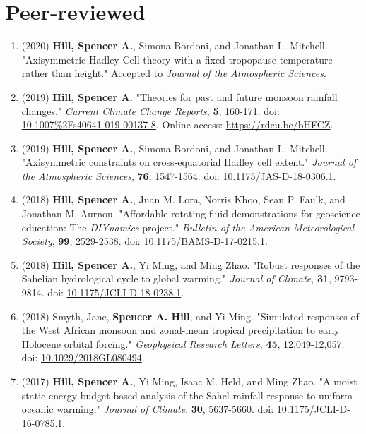 \documentclass[12pt,letterpaper]{shillcv}
\begin{document}
\section*{Peer-reviewed}
\label{sec:org142e150}
\begin{enumerate}
\item (2020) \textbf{Hill, Spencer A.}, Simona Bordoni, and Jonathan L. Mitchell.
"Axisymmetric Hadley Cell theory with a fixed tropopause temperature rather
than height."  Accepted to \emph{Journal of the Atmospheric Sciences}.
\item (2019) \textbf{Hill, Spencer A.} "Theories for past and future monsoon rainfall
changes."  \emph{Current Climate Change Reports}, \textbf{5}, 160-171.  doi:
\href{https://doi.org/10.1007\%2Fs40641-019-00137-8}{10.1007\%2Fs40641-019-00137-8}.  Online access: \url{https://rdcu.be/bHFCZ}.
\item (2019) \textbf{Hill, Spencer A.}, Simona Bordoni, and Jonathan L. Mitchell.
"Axisymmetric constraints on cross-equatorial Hadley cell extent."
\emph{Journal of the Atmospheric Sciences}, \textbf{76}, 1547-1564.  doi: \href{https://doi.org/10.1175/JAS-D-18-0306.1}{10.1175/JAS-D-18-0306.1}.
\item (2018) \textbf{Hill, Spencer A.}, Juan M. Lora, Norris Khoo, Sean P. Faulk, and
Jonathan M.  Aurnou.  "Affordable rotating fluid demonstrations for
geoscience education: The \emph{DIYnamics} project."  \emph{Bulletin of the
American Meteorological Society}, \textbf{99}, 2529-2538.  doi:
\href{https://doi.org/10.1175/BAMS-D-17-0215.1}{10.1175/BAMS-D-17-0215.1}.
\item (2018) \textbf{Hill, Spencer A.}, Yi Ming, and Ming Zhao.  "Robust responses of the
Sahelian hydrological cycle to global warming."  \emph{Journal of
Climate}, \textbf{31}, 9793-9814.  doi: \href{https://doi.org/10.1175/JCLI-D-18-0238.1}{10.1175/JCLI-D-18-0238.1}.
\item (2018) Smyth, Jane, \textbf{Spencer A. Hill}, and Yi Ming.  "Simulated responses of
the West African monsoon and zonal-mean tropical precipitation to early
Holocene orbital forcing."  \emph{Geophysical Research Letters}, \textbf{45},
12,049-12,057.  doi: \href{https://doi.org/10.1029/2018GL080494}{10.1029/2018GL080494}.
\item (2017) \textbf{Hill, Spencer A.}, Yi Ming, Isaac M. Held, and Ming Zhao.  "A moist
static energy budget-based analysis of the Sahel rainfall response to uniform
oceanic warming."  \emph{Journal of Climate}, \textbf{30}, 5637-5660.  doi:
\href{https://doi.org/10.1175/JCLI-D-16-0785.1}{10.1175/JCLI-D-16-0785.1}.

\end{enumerate}
\end{document}
